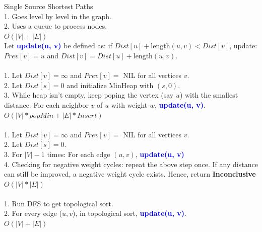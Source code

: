 \documentclass[10pt,a4paper]{article}
\begin{document}
\begin{multicols}{3}
\begin{textbox}{Single Source Shortest Paths}
      \\
    1. Goes level by level in the graph.\\
    2. Uses a queue to process nodes.\\ 
     $O(|V| + |E|)$ \\
    \linebreak
    Let  {\bf \textcolor{blue}{update(u, v)}} be defined as: if $Dist[u] + \text{length}(u, v)< Dist[v]$, update: $Prev[v] = u$ and $Dist[v] = Dist[u] + \text{length}(u, v)$.\\
      \\ 
    1. Let $Dist[v] = \infty$ and $Prev[v] = $ NIL for all vertices $v$.\\
    2. Let $Dist[s] = 0$ and initialize MinHeap with $(s, 0)$.\\
    3. While heap isn't empty, keep poping the vertex (say $u$) with the smallest distance. For each neighbor $v$ of $u$ with weight $w$, {\bf \textcolor{blue}{update(u, v)}}.\\
    \linebreak
     $O(|V|*popMin + |E|*Insert)$ \\
    \linebreak
     \\
    1. Let $Dist[v] = \infty$ and $Prev[v] = $ NIL for all vertices $v$.\\
    2. Let $Dist[s] = 0$.\\
    3. For $|V|-1$ times: For each edge $(u, v)$, {\bf \textcolor{blue}{update(u, v)}}\\
    4. Checking for negative weight cycles: repeat the above step once. If any distance can still be improved, a negative weight cycle exists. Hence, return {\bf Inconclusive}\\
    \linebreak
     $O(|V|*|E|)$ \\
    \linebreak
      \\
    1. Run DFS to get topological sort.\\
    2. For every edge ($u, v$), in topological sort, {\bf \textcolor{blue}{update(u, v)}}.\\
     $O(|V| + |E|)$ \\
\end{textbox}


\end{multicols}
\end{document}
